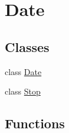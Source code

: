 \hypertarget{group___date}{}\section{Date}
\label{group___date}
\subsection*{Classes}
\begin{DoxyCompactItemize}
\item 
class \hyperlink{class_date}{Date}
\item 
class \hyperlink{class_stop}{Stop}
\end{DoxyCompactItemize}
\subsection*{Functions}
